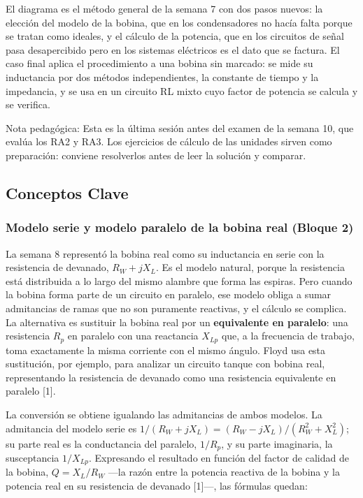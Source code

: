 \documentclass[11pt,letterpaper]{article}
\begin{document}
El diagrama es el método general de la semana 7 con dos pasos nuevos: la elección del modelo de la bobina, que en los condensadores no hacía falta porque se tratan como ideales, y el cálculo de la potencia, que en los circuitos de señal pasa desapercibido pero en los sistemas eléctricos es el dato que se factura. El caso final aplica el procedimiento a una bobina sin marcado: se mide su inductancia por dos métodos independientes, la constante de tiempo y la impedancia, y se usa en un circuito RL mixto cuyo factor de potencia se calcula y se verifica.

\begin{nota}{Nota pedagógica:}
Esta es la última sesión antes del examen de la semana 10, que evalúa los RA2 y RA3. Los ejercicios de cálculo de las unidades sirven como preparación: conviene resolverlos antes de leer la solución y comparar.
\end{nota}

\subsection{Conceptos Clave}

\subsubsection{Modelo serie y modelo paralelo de la bobina real (Bloque 2)}

La semana 8 representó la bobina real como su inductancia en serie con la resistencia de devanado, $R_W + jX_L$. Es el modelo natural, porque la resistencia está distribuida a lo largo del mismo alambre que forma las espiras. Pero cuando la bobina forma parte de un circuito en paralelo, ese modelo obliga a sumar admitancias de ramas que no son puramente reactivas, y el cálculo se complica. La alternativa es sustituir la bobina real por un \textbf{equivalente en paralelo}: una resistencia $R_p$ en paralelo con una reactancia $X_{Lp}$ que, a la frecuencia de trabajo, toma exactamente la misma corriente con el mismo ángulo. Floyd usa esta sustitución, por ejemplo, para analizar un circuito tanque con bobina real, representando la resistencia de devanado como una resistencia equivalente en paralelo [1].

La conversión se obtiene igualando las admitancias de ambos modelos. La admitancia del modelo serie es $1/(R_W + jX_L) = (R_W - jX_L)/(R_W^2 + X_L^2)$; su parte real es la conductancia del paralelo, $1/R_p$, y su parte imaginaria, la susceptancia $1/X_{Lp}$. Expresando el resultado en función del factor de calidad de la bobina, $Q = X_L/R_W$ ---la razón entre la potencia reactiva de la bobina y la potencia real en su resistencia de devanado [1]---, las fórmulas quedan:
\end{document}
